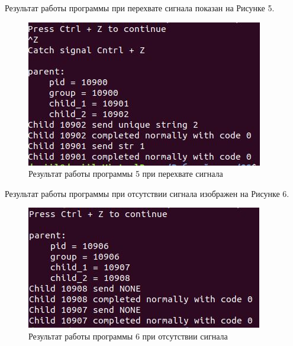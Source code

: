 \documentclass[14pt, a4paper]{extarticle}
\begin{document}
 	\clearpage
 	Результат работы программы при перехвате сигнала показан на Рисунке 5.
 	\begin{figure}[h!]
 		\centering
 		\includegraphics[scale=1]{source/5}
 		\caption{Результат работы программы 5 при перехвате сигнала}
 	\end{figure}
 	
	Результат работы программы при отсутствии сигнала изображен на Рисунке 6.
	\begin{figure}[h!]
		\centering
		\includegraphics[scale=1]{source/6}
		\caption{Результат работы программы 6 при отсутствии сигнала}
	\end{figure}
\end{document}
